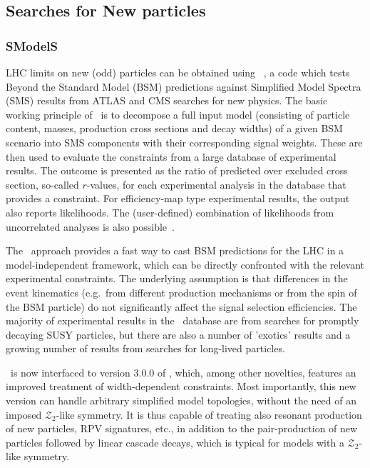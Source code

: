 \documentclass[12pt,a4paper]{article}
\begin{document}
\subsection{Searches for New particles}

\subsubsection{SModelS}

LHC limits on new (odd) particles can be obtained using \smodels~\cite{Kraml:2013mwa,Ambrogi:2017neo,Ambrogi:2018ujg,Alguero:2021dig,MahdiAltakach:2023bdn}, 
a code which tests Beyond the Standard Model (BSM) predictions against Simplified Model Spectra (SMS) 
results from ATLAS and CMS searches for new physics. 
The basic working principle of \smodels\ is to decompose a full input model (consisting of particle content, masses, production cross sections and decay widths) of a given BSM scenario into SMS components with their corresponding signal weights. 
These are then used to evaluate the constraints from a large database of experimental results. 
The outcome is presented as the ratio of predicted over excluded cross section, so-called $r$-values, for each experimental analysis 
in the database that provides a constraint. For efficiency-map type experimental results, the output also reports likelihoods.  
The (user-defined) combination of likelihoods from uncorrelated analyses is also possible~\cite{MahdiAltakach:2023bdn,Altakach:2023tsd}.

The \smodels\ approach provides a fast way to cast BSM predictions for the LHC in a model-independent framework, which can be directly confronted with the relevant experimental constraints. The underlying assumption is that differences in the event kinematics (e.g.\ from different production mechanisms or from the spin of the BSM particle) do not significantly affect the signal selection efficiencies. 
The majority of experimental results in the \smodels\ database are from searches for promptly decaying SUSY particles, but there are also 
a number of 'exotics' results and a growing number of results from searches for long-lived particles. 

\micro\ is now interfaced to version 3.0.0 of \smodels, which, among other novelties, features an improved treatment of width-dependent constraints. 
Most importantly, this new version can handle arbitrary simplified model topologies, without the need of an imposed $\mathcal{Z}_2$-like symmetry. 
It is thus capable of treating also resonant production of new particles, RPV signatures, etc., in addition to the    
pair-production of new particles followed by linear cascade decays, which is typical for models with a $\mathcal{Z}_2$-like symmetry.
\end{document}
